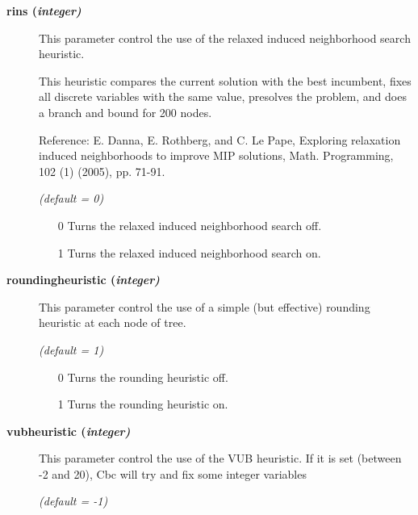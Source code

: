 \begin{description}
\item[\label{rins}\hypertarget{rins}
{\textbf{rins (\slshape{integer})}}]\hspace{1.0in}

This parameter control the use of the relaxed induced neighborhood search heuristic.

This heuristic compares the current solution with the best incumbent, fixes all discrete variables with the same value, presolves the problem, and does a branch and bound for 200 nodes.

Reference: E. Danna, E. Rothberg, and C. Le Pape, Exploring relaxation induced neighborhoods to improve MIP solutions, Math. Programming, 102 (1) (2005), pp. 71-91.

\textsl{(default = 0)}
\begin{itemize}
\item[0] 
Turns the relaxed induced neighborhood search off.
\item[1] 
Turns the relaxed induced neighborhood search on.
\end{itemize}

\item[\label{roundingheuristic}\hypertarget{roundingheuristic}
{\textbf{roundingheuristic (\slshape{integer})}}]\hspace{1.0in}

This parameter control the use of a simple (but effective) rounding heuristic at each node of tree.

\textsl{(default = 1)}
\begin{itemize}
\item[0] 
Turns the rounding heuristic off.
\item[1] 
Turns the rounding heuristic on.
\end{itemize}

\item[\label{vubheuristic}\hypertarget{vubheuristic}
{\textbf{vubheuristic (\slshape{integer})}}]\hspace{1.0in}

This parameter control the use of the VUB heuristic.
If it is set (between -2 and 20), Cbc will try  and fix some integer variables

\textsl{(default = -1)}

\end{description}


